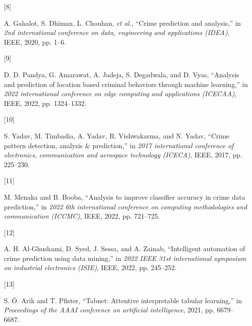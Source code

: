 \documentclass[11 pt,conference,final,]{IEEEtran}
\newlength{\cslhangindent}
\newlength{\csllabelwidth}
\newenvironment{CSLReferences}[2] %
 {\begin{list}{}{%
  \setlength{\itemindent}{0pt}
  \setlength{\leftmargin}{0pt}
  \setlength{\parsep}{0pt}
  \ifodd #1
   \setlength{\leftmargin}{\cslhangindent}
   \setlength{\itemindent}{-1\cslhangindent}
  \fi
  \setlength{\itemsep}{#2\baselineskip}}}
 {\end{list}}
\newcommand{\CSLLeftMargin}[1]{\parbox[t]{\csllabelwidth}{#1}}
\newcommand{\CSLRightInline}[1]{\parbox[t]{\linewidth - \csllabelwidth}{#1}\break}
\begin{document}
\begin{CSLReferences}{0}{0}
\CSLLeftMargin{{[}8{]} }%
\CSLRightInline{A. Gahalot, S. Dhiman, L. Chouhan, \emph{et al.},
{``Crime prediction and analysis,''} in \emph{2nd international
conference on data, engineering and applications (IDEA)}, IEEE, 2020,
pp. 1--6.}

\CSLLeftMargin{{[}9{]} }%
\CSLRightInline{D. D. Pandya, G. Amarawat, A. Jadeja, S. Degadwala, and
D. Vyas, {``Analysis and prediction of location based criminal behaviors
through machine learning,''} in \emph{2022 international conference on
edge computing and applications (ICECAA)}, IEEE, 2022, pp. 1324--1332.}

\CSLLeftMargin{{[}10{]} }%
\CSLRightInline{S. Yadav, M. Timbadia, A. Yadav, R. Vishwakarma, and N.
Yadav, {``Crime pattern detection, analysis \& prediction,''} in
\emph{2017 international conference of electronics, communication and
aerospace technology (ICECA)}, IEEE, 2017, pp. 225--230.}

\CSLLeftMargin{{[}11{]} }%
\CSLRightInline{M. Menaka and B. Booba, {``Analysis to improve
classifier accuracy in crime data prediction,''} in \emph{2022 6th
international conference on computing methodologies and communication
(ICCMC)}, IEEE, 2022, pp. 721--725.}

\CSLLeftMargin{{[}12{]} }%
\CSLRightInline{A. H. Al-Ghushami, D. Syed, J. Sessa, and A. Zainab,
{``Intelligent automation of crime prediction using data mining,''} in
\emph{2022 IEEE 31st international symposium on industrial electronics
(ISIE)}, IEEE, 2022, pp. 245--252.}

\CSLLeftMargin{{[}13{]} }%
\CSLRightInline{S. Ö. Arik and T. Pfister, {``Tabnet: Attentive
interpretable tabular learning,''} in \emph{Proceedings of the AAAI
conference on artificial intelligence}, 2021, pp. 6679--6687.}

\end{CSLReferences}
\end{document}
